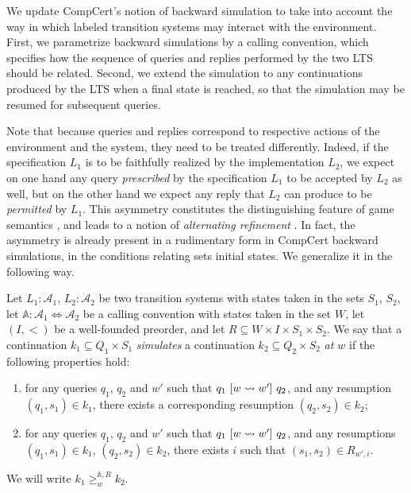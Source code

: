 We update CompCert's notion of backward simulation
to take into account the way in which labeled transition systems
may interact with the environment.
First,
we parametrize backward simulations by a calling convention,
which specifies how the sequence of queries and replies
performed by the two LTS should be related.
Second,
we extend the simulation to any continuations
produced by the LTS when a final state is reached,
so that the simulation may be resumed for subsequent queries.

Note that because queries and replies
correspond to respective actions of the environment and the system,
they need to be treated differently.
Indeed,
if the specification $L_1$ is to be faithfully realized
by the implementation $L_2$,
we expect on one hand
any query \emph{prescribed} by the specification $L_1$
to be accepted by $L_2$ as well,
but on the other hand
we expect any reply that $L_2$ can produce
to be \emph{permitted} by $L_1$.
This asymmetry constitutes the distinguishing feature
of game semantics \cite{cspgs},
and leads to a notion of \emph{alternating refinement} \cite{altref}.
In fact,
the asymmetry is already present in a rudimentary form
in CompCert backward simulations,
in the conditions relating sets initial states.
We generalize it in the following way.

\begin{definition}
Let $L_1 : \mathcal{A}_1$, $L_2 : \mathcal{A}_2$
be two transition systems with states taken in the sets $S_1$, $S_2$,
let $\mathbb{A} : \mathcal{A}_1 \Leftrightarrow \mathcal{A}_2$
be a calling convention with states taken in the set $W$,
let $(I, <)$ be a well-founded preorder, and
let $R \subseteq W \times I \times S_1 \times S_2$.
We say that
a continuation $k_1 \subseteq Q_1 \times S_1$
\emph{simulates}
a continuation $k_2 \subseteq Q_2 \times S_2$
\emph{at $w$}
if the following properties hold:
\begin{enumerate}
\item
  for any queries $q_1$, $q_2$ and $w'$ such that
  $q_1 \ [{w \leadsto w'}]\  q_2$,
  and any resumption $(q_1, s_1) \in k_1$,
  there exists a corresponding resumption $(q_2, s_2) \in k_2$;
\item
  for any queries $q_1$, $q_2$ and $w'$ such that
  $q_1 \ [{w \leadsto w'}]\  q_2$,
  and any resumptions $(q_1, s_1) \in k_1$, $(q_2, s_2) \in k_2$,
  there exists $i$ such that $(s_1, s_2) \in R_{w',i}$.
\end{enumerate}
We will write $k_1 \ge^{\mathbb{A},R}_w k_2$.
\end{definition}

